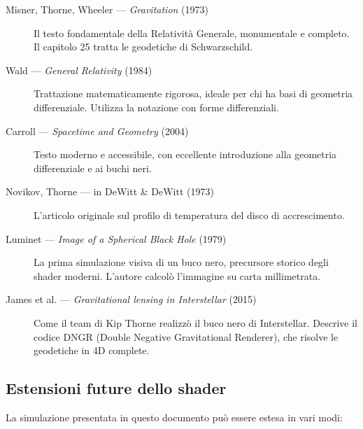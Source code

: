 \documentclass[12pt, a4paper, twoside]{article}
\theoremstyle{definition}
\begin{document}
\begin{description}
  \item[Misner, Thorne, Wheeler — \textit{Gravitation} (1973)]
    Il testo fondamentale della Relatività Generale, monumentale e completo.
    Il capitolo 25 tratta le geodetiche di Schwarzschild.

  \item[Wald — \textit{General Relativity} (1984)]
    Trattazione matematicamente rigorosa, ideale per chi ha basi di geometria
    differenziale. Utilizza la notazione con forme differenziali.

  \item[Carroll — \textit{Spacetime and Geometry} (2004)]
    Testo moderno e accessibile, con eccellente introduzione alla geometria
    differenziale e ai buchi neri.

  \item[Novikov, Thorne — in DeWitt \& DeWitt (1973)]
    L'articolo originale sul profilo di temperatura del disco di accrescimento.

  \item[Luminet — \textit{Image of a Spherical Black Hole} (1979)]
    La prima simulazione visiva di un buco nero, precursore storico degli
    shader moderni. L'autore calcolò l'immagine su carta millimetrata.

  \item[James et al. — \textit{Gravitational lensing in Interstellar} (2015)]
    Come il team di Kip Thorne realizzò il buco nero di Interstellar.
    Descrive il codice DNGR (Double Negative Gravitational Renderer),
    che risolve le geodetiche in 4D complete.
\end{description}

\subsection{Estensioni future dello shader}

La simulazione presentata in questo documento può essere estesa in vari modi:
\end{document}
